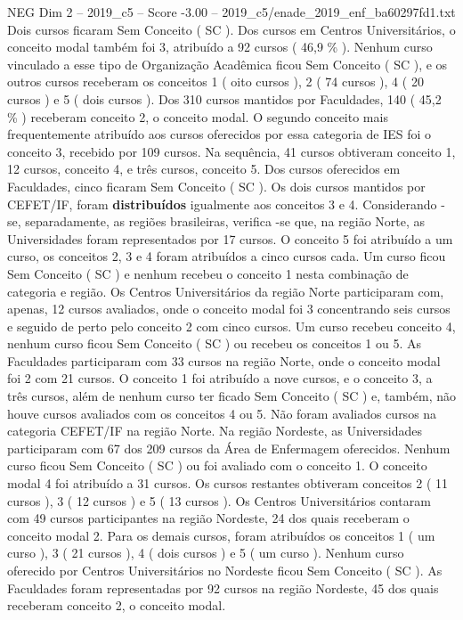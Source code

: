 \begin{textsample}{NEG Dim 2 – 2019\_c5 – Score -3.00 – 2019\_c5/enade\_2019\_enf\_ba60297fd1.txt}
Dois cursos ficaram Sem Conceito ( SC ).
Dos cursos em Centros Universitários, o conceito modal também foi 3, atribuído a 92 cursos ( 46,9 \% ).
Nenhum curso vinculado a esse tipo de Organização Acadêmica ficou Sem Conceito ( SC ), e os outros cursos receberam os conceitos 1 ( oito cursos ), 2 ( 74 cursos ), 4 ( 20 cursos ) e 5 ( dois cursos ).
Dos 310 cursos mantidos por Faculdades, 140 ( 45,2 \% ) receberam conceito 2, o conceito modal.
O segundo conceito mais frequentemente atribuído aos cursos oferecidos por essa categoria de IES foi o conceito 3, recebido por 109 cursos.
Na sequência, 41 cursos obtiveram conceito 1, 12 cursos, conceito 4, e três cursos, conceito 5.
Dos cursos oferecidos em Faculdades, cinco ficaram Sem Conceito ( SC ).
Os dois cursos mantidos por CEFET/IF, foram \textbf{distribuídos} igualmente aos conceitos 3 e 4.
Considerando -se, separadamente, as regiões brasileiras, verifica -se que, na região Norte, as Universidades foram representados por 17 cursos.
O conceito 5 foi atribuído a um curso, os conceitos 2, 3 e 4 foram atribuídos a cinco cursos cada.
Um curso ficou Sem Conceito ( SC ) e nenhum recebeu o conceito 1 nesta combinação de categoria e região.
Os Centros Universitários da região Norte participaram com, apenas, 12 cursos avaliados, onde o conceito modal foi 3 concentrando seis cursos e seguido de perto pelo conceito 2 com cinco cursos.
Um curso recebeu conceito 4, nenhum curso ficou Sem Conceito ( SC ) ou recebeu os conceitos 1 ou 5.
As Faculdades participaram com 33 cursos na região Norte, onde o conceito modal foi 2 com 21 cursos.
O conceito 1 foi atribuído a nove cursos, e o conceito 3, a três cursos, além de nenhum curso ter ficado Sem Conceito ( SC ) e, também, não houve cursos avaliados com os conceitos 4 ou 5.
Não foram avaliados cursos na categoria CEFET/IF na região Norte.
Na região Nordeste, as Universidades participaram com 67 dos 209 cursos da Área de Enfermagem oferecidos.
Nenhum curso ficou Sem Conceito ( SC ) ou foi avaliado com o conceito 1.
O conceito modal 4 foi atribuído a 31 cursos.
Os cursos restantes obtiveram conceitos 2 ( 11 cursos ), 3 ( 12 cursos ) e 5 ( 13 cursos ).
Os Centros Universitários contaram com 49 cursos participantes na região Nordeste, 24 dos quais receberam o conceito modal 2.
Para os demais cursos, foram atribuídos os conceitos 1 ( um curso ), 3 ( 21 cursos ), 4 ( dois cursos ) e 5 ( um curso ).
Nenhum curso oferecido por Centros Universitários no Nordeste ficou Sem Conceito ( SC ).
As Faculdades foram representadas por 92 cursos na região Nordeste, 45 dos quais receberam conceito 2, o conceito modal.

\end{textsample}
